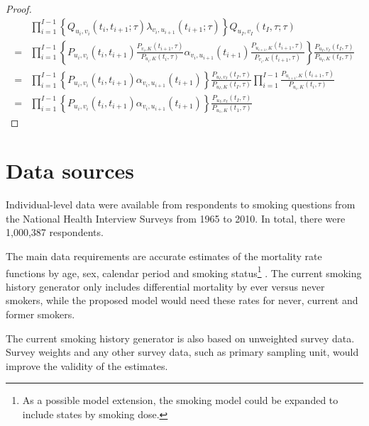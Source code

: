 \documentclass[11pt,a4paper]{article}
\begin{document}
\begin{proof}
\begin{align*} 
& \prod_{i=1}^{I-1} \left\{Q_{u_i,v_i}(t_i,t_{i+1};\tau) \lambda_{v_i,u_{i+1}}(t_{i+1};\tau)\right\}Q_{u_I,v_I}(t_I,\tau;\tau)\\
= & \prod_{i=1}^{I-1} \left\{P_{u_i,v_i}(t_i,t_{i+1})\frac{P_{v_i,K}(t_{i+1},\tau)}{P_{u_i,K}(t_{i},\tau)} \alpha_{v_i,u_{i+1}}(t_{i+1})\frac{P_{u_{i+1},K}(t_{i+1},\tau)}{P_{v_i,K}(t_{i+1},\tau)}\right\}\frac{P_{u_I,v_I}(t_I,\tau)}{P_{u_I,K}(t_{I},\tau)} \\
 = & \prod_{i=1}^{I-1} \left\{P_{u_i,v_i}(t_i,t_{i+1})\alpha_{v_i,u_{i+1}}(t_{i+1})\right\} 
\frac{P_{u_I,v_I}(t_I,\tau)}{P_{u_I,K}(t_{I},\tau)}
 \prod_{i=1}^{I-1} \frac{P_{u_{i+1},K}(t_{i+1},\tau)}{P_{u_i,K}(t_{i},\tau)} \\
 = & \prod_{i=1}^{I-1} \left\{P_{u_i,v_i}(t_i,t_{i+1})\alpha_{v_i,u_{i+1}}(t_{i+1})\right\} 
\frac{P_{u_I,v_I}(t_I,\tau)}{P_{u_1,K}(t_{1},\tau)}
\end{align*}
\end{proof} 

\section{Data sources}


Individual-level data were available from respondents to smoking questions from the National Health Interview Surveys from 1965 to 2010. In total, there were 1,000,387 respondents. 

The main data requirements are accurate estimates of the mortality
rate functions by age, sex, calendar period and smoking
status\footnote{As a possible model extension, the smoking model could
  be expanded to include states by smoking dose.}  . The current
smoking history generator only includes differential mortality by ever
versus never smokers, while the proposed model would need these rates
for never, current and former smokers.

The current smoking history generator is also based on unweighted
survey data. Survey weights and any other survey data, such as primary
sampling unit, would improve the validity of the estimates. 
\end{document}

